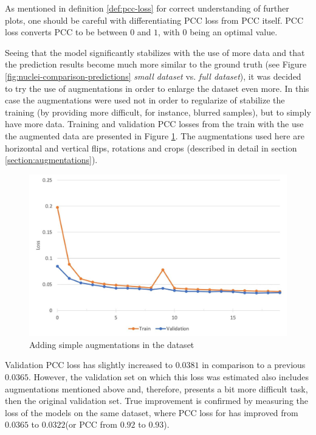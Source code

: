 As mentioned in definition \ref{def:pcc-loss} for correct understanding of further plots, one should be careful with differentiating PCC loss from PCC itself. PCC loss converts PCC to be between $0$ and $1$, with $0$ being an optimal value.

Seeing that the model significantly stabilizes with the use of more data and that the prediction results become much more similar to the ground truth (see Figure \ref{fig:nuclei-comparison-predictions} \textit{small dataset} vs. \textit{full dataset}), it was decided to try the use of augmentations in order to enlarge the dataset even more. In this case the augmentations were used not in order to regularize of stabilize the training (by providing more difficult, for instance, blurred samples), but to simply have more data. Training and validation PCC losses from the train with the use the augmented data are presented in Figure \ref{fig:no-reg-augmented}. The augmentations used here are horizontal and vertical flips, rotations and crops (described in detail in section \ref{section:augmentations}).
\begin{figure}[H]
	\begin{center}
		\includegraphics[width=0.8\linewidth]{bilder/nuclei/no-reg-but-aug.jpg}
		\caption{Adding simple augmentations in the dataset}\label{fig:no-reg-augmented}
	\end{center}
\end{figure}
Validation PCC loss has slightly increased to $0.0381$ in comparison to a previous $0.0365$. However, the validation set on which this loss was estimated also includes augmentations mentioned above and, therefore, presents a bit more difficult task, then the original validation set. True improvement is confirmed by measuring the loss of the models on the same dataset, where PCC loss for has improved from $0.0365$ to $0.0322$(or PCC from $0.92$ to $0.93$).

